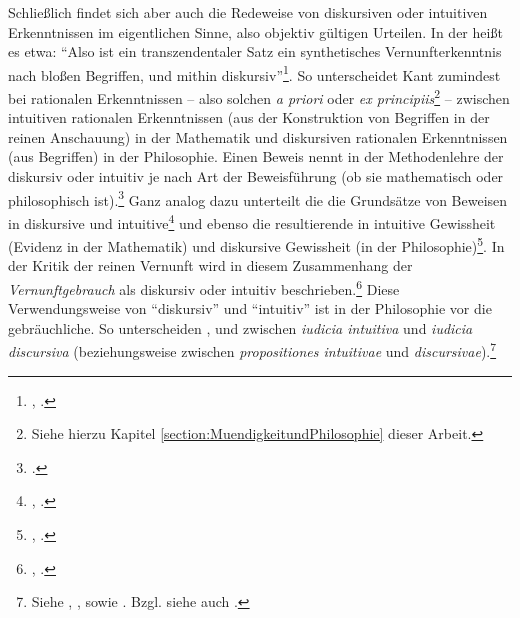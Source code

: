 \begin{nummerierung}
\item\label{Aufzaehlung:Vernunftgebrauchintuitivoderdiskursiv} Schließlich
findet sich aber auch die Redeweise von diskursiven oder intuitiven
Erkenntnissen im eigentlichen Sinne, also objektiv gültigen Urteilen. In der
 heißt es etwa: \enquote{Also ist ein
transzendentaler Satz ein synthetisches Vernunfterkenntnis nach bloßen
Begriffen, und mithin diskursiv}\footnote{\cite[][B
750]{Kant:KritikderreinenVernunft2003}, \cite[][III:
474.21--23]{Kant:GesammelteWerke1900ff.}.}. So unterscheidet Kant zumindest bei
rationalen Erkenntnissen -- also solchen \emph{a priori} oder \emph{ex principiis}\footnote{Siehe
hierzu Kapitel \ref{section:MuendigkeitundPhilosophie} dieser Arbeit.} --
zwischen intuitiven rationalen Erkenntnissen (aus der Konstruktion von Begriffen
in der reinen Anschauung) in der Mathematik und diskursiven rationalen
Erkenntnissen (aus Begriffen) in der Philosophie. Einen Beweis nennt
 in der Methodenlehre der  diskursiv oder intuitiv je nach Art der Beweisführung (ob sie
mathematisch oder philosophisch ist).\footnote{\cite[][B
762\,f.,]{Kant:KritikderreinenVernunft2003} \cite[][III:
481.15--482.2]{Kant:GesammelteWerke1900ff.}.} Ganz analog dazu unterteilt die
 die Grundsätze von Beweisen in diskursive und
intuitive\footnote{\cite[Vgl.][\S~35]{Kant:ImmanuelKantsLogik1977}, \cite[][IX:
110.24--28]{Kant:GesammelteWerke1900ff.}.} und ebenso die resultierende
 in intuitive Gewissheit (Evidenz in der Mathematik) und
diskursive Gewissheit (in der Philosophie)\footnote{\cite[Vgl.][A
107]{Kant:ImmanuelKantsLogik1977}, \cite[][IX:
70.34--37]{Kant:GesammelteWerke1900ff.}.}. In der Kritik der reinen Vernunft
wird in diesem Zusammenhang der \emph{Vernunftgebrauch} als diskursiv oder
intuitiv beschrieben.\footnote{\cite[Vgl.][B
747]{Kant:KritikderreinenVernunft2003}, \cite[][III:
472.25--28]{Kant:GesammelteWerke1900ff.}.}
Diese Verwendungsweise von \enquote{diskursiv} und \enquote{intuitiv} ist in der Philosophie
vor  die gebräuchliche. So unterscheiden
,
 und
 zwischen \emph{iudicia
intuitiva} und \emph{iudicia discursiva} (beziehungsweise
zwischen \emph{propositiones intuitivae} und \emph{discursivae}).\footnote{Siehe
\cite[][\S~51]{Wolff:PhilosophiarationalissiveLogica1740},
\cite[][\S~166]{Baumgarten:AcroasislogicainChristianumL.B.deWolff1983}, sowie
\cite[][\S~319]{Meier:AuszugausderVernunftlehre1752}
\parencite[][XVI: 674.24--28]{Kant:GesammelteWerke1900ff.}. Bzgl.
 siehe
auch
\cite{Ecole:Duroledelentendementintuitifdanslaconceptionwolffiennedelaconnaissance1986}.}
\end{nummerierung}

